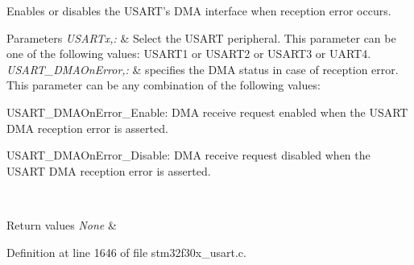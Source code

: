 Enables or disables the U\-S\-A\-R\-T's D\-M\-A interface when reception error occurs. 


\begin{DoxyParams}{Parameters}
{\em U\-S\-A\-R\-Tx,\-:} & Select the U\-S\-A\-R\-T peripheral. This parameter can be one of the following values\-: U\-S\-A\-R\-T1 or U\-S\-A\-R\-T2 or U\-S\-A\-R\-T3 or U\-A\-R\-T4. \\
\hline
{\em U\-S\-A\-R\-T\-\_\-\-D\-M\-A\-On\-Error,\-:} & specifies the D\-M\-A status in case of reception error. This parameter can be any combination of the following values\-: \begin{DoxyItemize}
\item U\-S\-A\-R\-T\-\_\-\-D\-M\-A\-On\-Error\-\_\-\-Enable\-: D\-M\-A receive request enabled when the U\-S\-A\-R\-T D\-M\-A reception error is asserted. \item U\-S\-A\-R\-T\-\_\-\-D\-M\-A\-On\-Error\-\_\-\-Disable\-: D\-M\-A receive request disabled when the U\-S\-A\-R\-T D\-M\-A reception error is asserted. \end{DoxyItemize}
\\
\hline
\end{DoxyParams}

\begin{DoxyRetVals}{Return values}
{\em None} & \\
\hline
\end{DoxyRetVals}


Definition at line 1646 of file stm32f30x\-\_\-usart.\-c.

